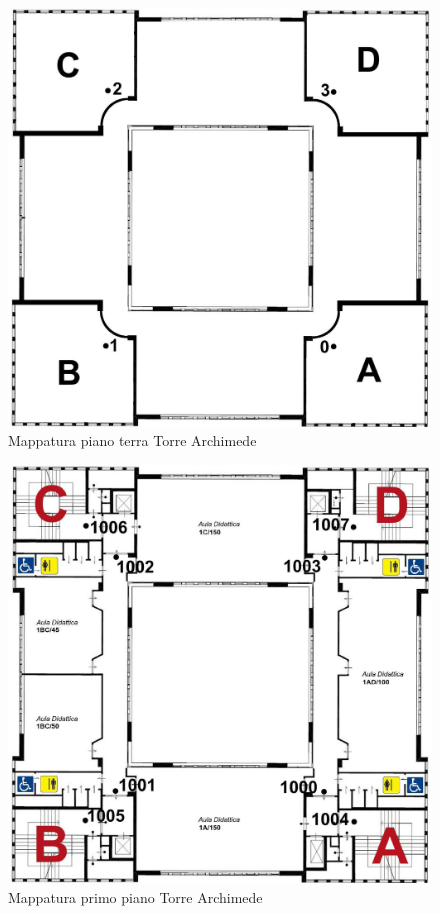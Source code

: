 \documentclass[../SperimentazioniPratiche.tex]{subfiles}
\begin{document}
			\begin{figure}[h]
				\includegraphics[width=\textwidth]{img/PianoTerra}
				\caption{Mappatura piano terra Torre Archimede}
				\label{fig:PianoTerra}
			\end{figure}						

			\begin{figure}[h]
				\includegraphics[width=\textwidth]{img/PrimoPiano}
				\caption{Mappatura primo piano Torre Archimede}
				\label{fig:PrimoPiano}
			\end{figure}
			
\end{document}
